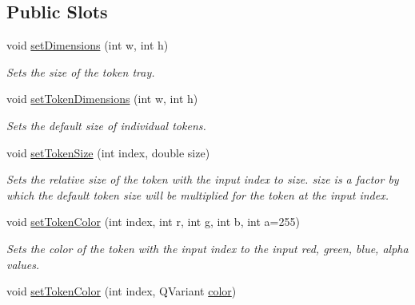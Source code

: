 \subsection*{Public Slots}
\begin{DoxyCompactItemize}
\item 
\hypertarget{class_picto_1_1_token_tray_graphic_acbd1d4c26c844a42c0a6c258ead187b5}{void \hyperlink{class_picto_1_1_token_tray_graphic_acbd1d4c26c844a42c0a6c258ead187b5}{set\-Dimensions} (int w, int h)}\label{class_picto_1_1_token_tray_graphic_acbd1d4c26c844a42c0a6c258ead187b5}

\begin{DoxyCompactList}\small\item\em Sets the size of the token tray. \end{DoxyCompactList}\item 
\hypertarget{class_picto_1_1_token_tray_graphic_a9920d043857d055c5ddebeb97a8c7b70}{void \hyperlink{class_picto_1_1_token_tray_graphic_a9920d043857d055c5ddebeb97a8c7b70}{set\-Token\-Dimensions} (int w, int h)}\label{class_picto_1_1_token_tray_graphic_a9920d043857d055c5ddebeb97a8c7b70}

\begin{DoxyCompactList}\small\item\em Sets the default size of individual tokens. \end{DoxyCompactList}\item 
\hypertarget{class_picto_1_1_token_tray_graphic_a5a945b52ff8ddfe955586171afbb8f59}{void \hyperlink{class_picto_1_1_token_tray_graphic_a5a945b52ff8ddfe955586171afbb8f59}{set\-Token\-Size} (int index, double size)}\label{class_picto_1_1_token_tray_graphic_a5a945b52ff8ddfe955586171afbb8f59}

\begin{DoxyCompactList}\small\item\em Sets the relative size of the token with the input index to size. size is a factor by which the default token size will be multiplied for the token at the input index. \end{DoxyCompactList}\item 
\hypertarget{class_picto_1_1_token_tray_graphic_aa5b1a0d10494e88a9d97bbb75792c4be}{void \hyperlink{class_picto_1_1_token_tray_graphic_aa5b1a0d10494e88a9d97bbb75792c4be}{set\-Token\-Color} (int index, int r, int g, int b, int a=255)}\label{class_picto_1_1_token_tray_graphic_aa5b1a0d10494e88a9d97bbb75792c4be}

\begin{DoxyCompactList}\small\item\em Sets the color of the token with the input index to the input red, green, blue, alpha values. \end{DoxyCompactList}\item 
\hypertarget{class_picto_1_1_token_tray_graphic_a63c3e2e677245eefeb2845ece59f76aa}{void \hyperlink{class_picto_1_1_token_tray_graphic_a63c3e2e677245eefeb2845ece59f76aa}{set\-Token\-Color} (int index, Q\-Variant \hyperlink{struct_picto_1_1_visual_element_a45c3042c969717eb2ab60373369c7de7}{color})}\label{class_picto_1_1_token_tray_graphic_a63c3e2e677245eefeb2845ece59f76aa}


\end{DoxyCompactItemize}
